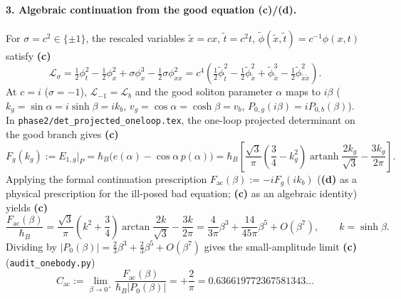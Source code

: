 \documentclass[11pt,a4paper]{article}
\newcommand{\claim}[1]{\textbf{(#1)}}
\begin{document}
\paragraph{3. Algebraic continuation from the good equation \claim{c}/\claim{d}.}
For $\sigma = c^2 \in \{\pm 1\}$, the rescaled variables $\tilde x = cx$, $\tilde t = c^2 t$,
$\tilde\phi(\tilde x,\tilde t) = c^{-1}\phi(x,t)$ satisfy \claim{c}
\begin{equation}
  \mathcal{L}_\sigma = \tfrac{1}{2}\phi_t^2 - \tfrac{1}{2}\phi_x^2 + \sigma\phi_x^3 - \tfrac{1}{2}\sigma\phi_{xx}^2
  = c^4\left(\tfrac{1}{2}\tilde\phi_{\tilde t}^2 - \tfrac{1}{2}\tilde\phi_{\tilde x}^2 + \tilde\phi_{\tilde x}^3 - \tfrac{1}{2}\tilde\phi_{\tilde x\tilde x}^2\right).
\end{equation}
At $c = i$ ($\sigma = -1$), $\mathcal{L}_{-1} = \mathcal{L}_b$ and the good soliton parameter
$\alpha$ maps to $i\beta$ ($k_g = \sin\alpha = i\sinh\beta = ik_b$, $v_g = \cos\alpha = \cosh\beta = v_b$,
$P_{0,g}(i\beta) = iP_{0,b}(\beta)$).
In \texttt{phase2/det\_projected\_oneloop.tex}, the one-loop projected determinant on the good branch gives \claim{c}
\begin{equation}
  F_g(k_g) := E_{1,g}\big|_{P} = \hbar_B\bigl(e(\alpha) - \cos\alpha\,p(\alpha)\bigr)
  = \hbar_B\left[\frac{\sqrt{3}}{\pi}\left(\frac{3}{4} - k_g^2\right)\operatorname{artanh}\frac{2k_g}{\sqrt{3}}
    - \frac{3k_g}{2\pi}\right].
  \label{eq:Fg}
\end{equation}
Applying the formal continuation prescription $F_{\mathrm{ac}}(\beta) := -iF_g(ik_b)$ (\claim{d} as a
physical prescription for the ill-posed bad equation; \claim{c} as an algebraic identity) yields \claim{c}
\begin{equation}
  \frac{F_{\mathrm{ac}}(\beta)}{\hbar_B}
  = \frac{\sqrt{3}}{\pi}\left(k^2 + \frac{3}{4}\right)\arctan\frac{2k}{\sqrt{3}} - \frac{3k}{2\pi}
  = \frac{4}{3\pi}\beta^3 + \frac{14}{45\pi}\beta^5 + O(\beta^7), \qquad k = \sinh\beta.
  \label{eq:Fac}
\end{equation}
Dividing by $|P_0(\beta)| = \frac{2}{3}\beta^3 + \frac{2}{3}\beta^5 + O(\beta^7)$ gives the small-amplitude
limit \claim{c} (\texttt{audit\_onebody.py})
\begin{equation}
  C_{\mathrm{ac}} := \lim_{\beta\to 0^+}\frac{F_{\mathrm{ac}}(\beta)}{\hbar_B |P_0(\beta)|} = +\frac{2}{\pi}
  = 0.636619772367581343\dots
\end{equation}
\end{document}

